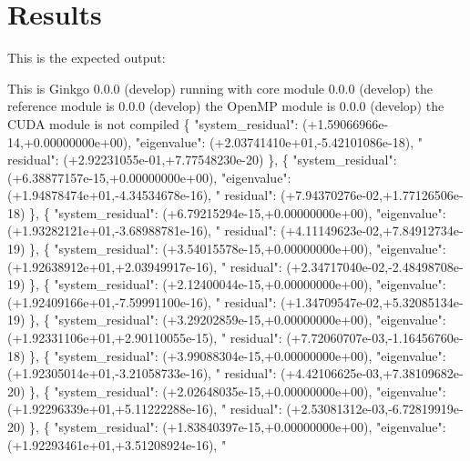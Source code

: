 \section*{Results}

This is the expected output\+:


\begin{DoxyCode}
This is Ginkgo 0.0.0 (develop)
    running with core module 0.0.0 (develop)
    the reference module is  0.0.0 (develop)
    the OpenMP    module is  0.0.0 (develop)
    the CUDA      module is  not compiled
\{ \textcolor{stringliteral}{"system\_residual"}: (+1.59066966e-14,+0.00000000e+00), \textcolor{stringliteral}{"eigenvalue"}: (+2.03741410e+01,-5.42101086e-18), \textcolor{stringliteral}{"
      residual"}: (+2.92231055e-01,+7.77548230e-20) \},
\{ \textcolor{stringliteral}{"system\_residual"}: (+6.38877157e-15,+0.00000000e+00), \textcolor{stringliteral}{"eigenvalue"}: (+1.94878474e+01,-4.34534678e-16), \textcolor{stringliteral}{"
      residual"}: (+7.94370276e-02,+1.77126506e-18) \},
\{ \textcolor{stringliteral}{"system\_residual"}: (+6.79215294e-15,+0.00000000e+00), \textcolor{stringliteral}{"eigenvalue"}: (+1.93282121e+01,-3.68988781e-16), \textcolor{stringliteral}{"
      residual"}: (+4.11149623e-02,+7.84912734e-19) \},
\{ \textcolor{stringliteral}{"system\_residual"}: (+3.54015578e-15,+0.00000000e+00), \textcolor{stringliteral}{"eigenvalue"}: (+1.92638912e+01,+2.03949917e-16), \textcolor{stringliteral}{"
      residual"}: (+2.34717040e-02,-2.48498708e-19) \},
\{ \textcolor{stringliteral}{"system\_residual"}: (+2.12400044e-15,+0.00000000e+00), \textcolor{stringliteral}{"eigenvalue"}: (+1.92409166e+01,-7.59991100e-16), \textcolor{stringliteral}{"
      residual"}: (+1.34709547e-02,+5.32085134e-19) \},
\{ \textcolor{stringliteral}{"system\_residual"}: (+3.29202859e-15,+0.00000000e+00), \textcolor{stringliteral}{"eigenvalue"}: (+1.92331106e+01,+2.90110055e-15), \textcolor{stringliteral}{"
      residual"}: (+7.72060707e-03,-1.16456760e-18) \},
\{ \textcolor{stringliteral}{"system\_residual"}: (+3.99088304e-15,+0.00000000e+00), \textcolor{stringliteral}{"eigenvalue"}: (+1.92305014e+01,-3.21058733e-16), \textcolor{stringliteral}{"
      residual"}: (+4.42106625e-03,+7.38109682e-20) \},
\{ \textcolor{stringliteral}{"system\_residual"}: (+2.02648035e-15,+0.00000000e+00), \textcolor{stringliteral}{"eigenvalue"}: (+1.92296339e+01,+5.11222288e-16), \textcolor{stringliteral}{"
      residual"}: (+2.53081312e-03,-6.72819919e-20) \},
\{ \textcolor{stringliteral}{"system\_residual"}: (+1.83840397e-15,+0.00000000e+00), \textcolor{stringliteral}{"eigenvalue"}: (+1.92293461e+01,+3.51208924e-16), \textcolor{stringliteral}{"
}
\end{DoxyCode}
